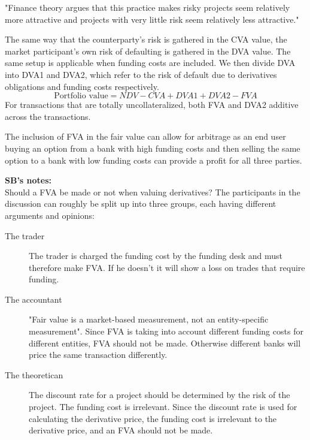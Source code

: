 \documentclass[10pt,a4paper]{article}
\begin{document}
        "Finance theory argues that this practice makes risky projects seem relatively more attractive and projects with very little risk seem relatively less attractive."

        The same way that the counterparty's risk is gathered in the CVA value, the market participant's own risk of defaulting is gathered in the DVA value. The same setup is applicable when funding costs are included. We then divide DVA into DVA1 and DVA2, which refer to the risk of default due to derivatives obligations and funding costs respectively.
        \begin{equation}
            \text{Portfolio value} = NDV - CVA + DVA1 + DVA2 - FVA
        \end{equation}
        For transactions that are totally uncollateralized, both FVA and DVA2 additive across the transactions.

        The inclusion of FVA in the fair value can allow for arbitrage as an end user buying an option from a bank with high funding costs and then selling the same option to a bank with low funding costs can provide a profit for all three parties.

        \textbf{SB's notes:} \\
        Should a FVA be made or not when valuing derivatives? The participants in the discussion can roughly be split up into three groups, each having different arguments and opinions:

        \begin{description}
            \item[The trader] The trader is charged the funding cost by the funding desk and must therefore make FVA. If he doesn't it will show a loss on trades that require funding.
            
            \item[The accountant] "Fair value is a market-based measurement, not an entity-specific measurement". Since FVA is taking into account different funding costs for different entities, FVA should not be made. Otherwise different banks will price the same transaction differently.
            
            \item[The theoretican] The discount rate for a project should be determined by the risk of the project. The funding cost is irrelevant. Since the discount rate is used for calculating the derivative price, the funding cost is irrelevant to the derivative price, and an FVA should not be made.
        \end{description}
\end{document}
